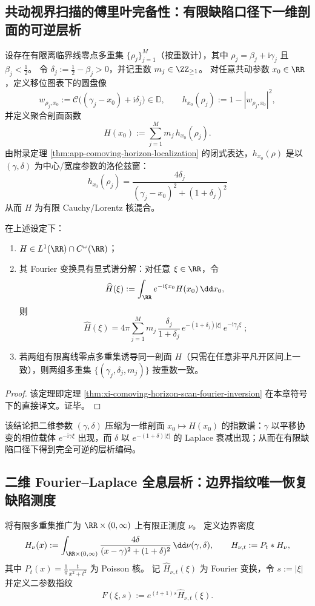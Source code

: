 \subsection{共动视界扫描的傅里叶完备性：有限缺陷口径下一维剖面的可逆层析}\label{subsec:cdim-comoving-horizon-scan-fourier-completeness}
设存在有限离临界线零点多重集 \(\{\rho_j\}_{j=1}^{M}\)（按重数计），其中
\(\rho_j=\beta_j+\mathrm{i}\gamma_j\) 且 \(\beta_j<\tfrac12\)。
令 \(\delta_j:=\tfrac12-\beta_j>0\)，并记重数 \(m_j\in\ZZ_{\ge 1}\)。
对任意共动参数 \(x_0\in\RR\)，定义移位图表下的圆盘像
\[
w_{\rho_j,x_0}:=\mathcal{C}\!\bigl((\gamma_j-x_0)+\mathrm{i}\delta_j\bigr)\in\mathbb{D},
\qquad
h_{x_0}(\rho_j):=1-|w_{\rho_j,x_0}|^2,
\]
并定义聚合剖面函数
\[
H(x_0):=\sum_{j=1}^{M}m_j\,h_{x_0}(\rho_j).
\]
由附录定理 \ref{thm:app-comoving-horizon-localization} 的闭式表达，\(h_{x_0}(\rho)\) 是以 \((\gamma,\delta)\) 为中心/宽度参数的洛伦兹窗：
\[
\boxed{\;
h_{x_0}(\rho_j)=\frac{4\delta_j}{(\gamma_j-x_0)^2+(1+\delta_j)^2}\;}
\]
从而 \(H\) 为有限 Cauchy/Lorentz 核混合。

\begin{theorem}\label{thm:cdim-comoving-horizon-scan-fourier-inversion}
在上述设定下：
\begin{enumerate}
  \item \(H\in L^1(\RR)\cap C^\omega(\RR)\)；
  \item 其 Fourier 变换具有显式谱分解：对任意 \(\xi\in\RR\)，令
  \[
  \widehat H(\xi):=\int_{\RR}e^{-\mathrm{i}\xi x_0}H(x_0)\,\dd x_0,
  \]
  则
  \[
  \boxed{\;
  \widehat H(\xi)
  =4\pi\sum_{j=1}^{M}m_j\,\frac{\delta_j}{1+\delta_j}\,e^{-(1+\delta_j)|\xi|}\,e^{-\mathrm{i}\gamma_j\xi}\; } ;
  \]
  \item 若两组有限离线零点多重集诱导同一剖面 \(H\)（只需在任意非平凡开区间上一致），则两组多重集 \(\{(\gamma_j,\delta_j,m_j)\}\) 按重数一致。
\end{enumerate}
\end{theorem}
\begin{proof}
该定理即定理 \ref{thm:xi-comoving-horizon-scan-fourier-inversion} 在本章符号下的直接译文。证毕。
\end{proof}
该结论把二维参数 \((\gamma,\delta)\) 压缩为一维剖面 \(x_0\mapsto H(x_0)\) 的指数谱：\(\gamma\) 以平移协变的相位载体 \(e^{-\mathrm{i}\gamma\xi}\) 出现，而 \(\delta\) 以 \(e^{-(1+\delta)|\xi|}\) 的 Laplace 衰减出现；从而在有限缺陷口径下得到完全可逆的层析编码。

\subsection{二维 Fourier--Laplace 全息层析：边界指纹唯一恢复缺陷测度}\label{subsec:cdim-fourier-laplace-holographic-tomography}
将有限多重集推广为 \(\RR\times(0,\infty)\) 上有限正测度 \(\nu\)。
定义边界密度
\[
H_\nu(x):=\int_{\RR\times(0,\infty)}\frac{4\delta}{(x-\gamma)^2+(1+\delta)^2}\,\dd\nu(\gamma,\delta),
\qquad
H_{\nu,t}:=P_t*H_\nu,
\]
其中 \(P_t(x)=\frac{1}{\pi}\frac{t}{x^2+t^2}\) 为 Poisson 核。
记 \(\widehat H_{\nu,t}(\xi)\) 为 Fourier 变换，令 \(s:=|\xi|\) 并定义二参数指纹
\[
F(\xi,s):=e^{(t+1)s}\widehat H_{\nu,t}(\xi).
\]

